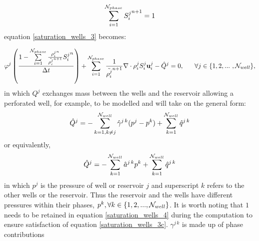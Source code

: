 \begin{equation}
\sum\limits_{i=1}^{{\cal N}_{phase}} 
{S_i^{j}}^{n+1}
= 1
\label{saturation_wells_3c}
\end{equation}  
equation 
\ref{saturation_wells_3} becomes: 

\begin{equation}
\phi^j
\left(  \frac{  
1
-  
\sum\limits_{i=1}^{{\cal N}_{phase}} 
\frac{ {\rho_{i}^{j}}^{n} }
{  \tilde{\rho_{i}^{j}}^{n+1}  }
{S_i^{j}}^n
}
{\Delta t}
\right) 
+ 
\sum\limits_{i=1}^{{\cal N}_{phase}}
\frac{1}{  \tilde{\rho_{i}^{j}}^{n+1}   }
\nabla\cdot\rho_{i}^{j}S_i^{j}\mathbf{u}_i^{j} 
-\hat Q^j = 0, 
~~~~~ \forall j \in\{ 1,2,...~ , {\cal N}_{well}\}, 
\label{saturation_wells_4}
\end{equation}
in which $Q^j$ exchanges mass between the 
wells and the reservoir allowing a perforated well,  
for example, to be modelled and will take on the general form:
\begin{equation}
\hat Q^j = - \sum_{k=1, k\neq j}^{{\cal N}_{well}} 
\hat\gamma^{j \, k} (p^j - p^k)
+\sum_{k=1}^{{\cal N}_{well}} 
\hat q^{j \, k}
\label{saturation_wells_5}
\end{equation}
or equivalently, 
\begin{equation}
\hat Q^j = - \sum_{k=1}^{{\cal N}_{well}} 
\hat a^{j \, k} p^k
+\sum_{k=1}^{{\cal N}_{well}} 
\hat q^{j \, k}
\label{saturation_wells_5-a}
\end{equation}
in which $p^j$ is the pressure of well or reservoir $j$ and 
superscript $k$ refers to the other wells or the reservoir. 
Thus the reservoir and the wells have different pressures within 
their phases, $p^k, \forall k\in\{1,2,...,{\cal N}_{well}\}$. It is worth noting that 
$1$ needs to be retained in equation \ref{saturation_wells_4} during the computation to 
ensure satisfaction of equation \ref{saturation_wells_3c}. 
$\gamma^{j\,k}$ is made up of phase contributions

